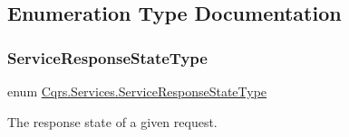 \subsection{Enumeration Type Documentation}
\mbox{\label{namespaceCqrs_1_1Services_a41411b784c4fcb7eed0cef2a5b522de0_a41411b784c4fcb7eed0cef2a5b522de0}} 
\subsubsection{\texorpdfstring{Service\+Response\+State\+Type}{ServiceResponseStateType}}
{\footnotesize\ttfamily enum \hyperlink{namespaceCqrs_1_1Services_a41411b784c4fcb7eed0cef2a5b522de0_a41411b784c4fcb7eed0cef2a5b522de0}{Cqrs.\+Services.\+Service\+Response\+State\+Type}\hspace{0.3cm}{\ttfamily [strong]}}



The response state of a given request. 

